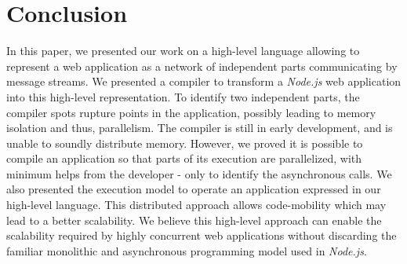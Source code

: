 \section{Conclusion} \label{section:conclusion}


In this paper, we presented our work on a high-level language allowing to represent a web application as a network of independent parts communicating by message streams.
We presented a compiler to transform a \textit{Node.js} web application into this high-level representation.
To identify two independent parts, the compiler spots rupture points in the application, possibly leading to memory isolation and thus, parallelism.
The compiler is still in early development, and is unable to soundly distribute memory.
However, we proved it is possible to compile an application so that parts of its execution are parallelized, with minimum helps from the developer - only to identify the asynchronous calls.
We also presented the execution model to operate an application expressed in our high-level language.
This distributed approach allows code-mobility which may lead to a better scalability.
We believe this high-level approach can enable the scalability required by highly concurrent web applications without discarding the familiar monolithic and asynchronous programming model used in \textit{Node.js}.






